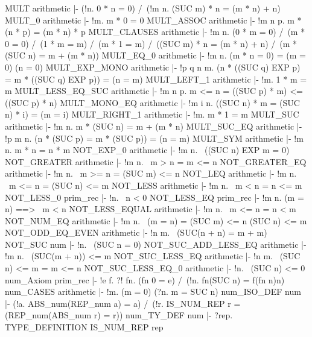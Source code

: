 \THEOREM MULT arithmetic
|- (!n. 0 * n = 0) /\ (!m n. (SUC m) * n = (m * n) + n)
\ENDTHEOREM
\THEOREM MULT\_0 arithmetic
|- !m. m * 0 = 0
\ENDTHEOREM
\THEOREM MULT\_ASSOC arithmetic
|- !m n p. m * (n * p) = (m * n) * p
\ENDTHEOREM
\THEOREM MULT\_CLAUSES arithmetic
|- !m n.
    (0 * m = 0) /\
    (m * 0 = 0) /\
    (1 * m = m) /\
    (m * 1 = m) /\
    ((SUC m) * n = (m * n) + n) /\
    (m * (SUC n) = m + (m * n))
\ENDTHEOREM
\THEOREM MULT\_EQ\_0 arithmetic
|- !m n. (m * n = 0) = (m = 0) \/ (n = 0)
\ENDTHEOREM
\THEOREM MULT\_EXP\_MONO arithmetic
|- !p q n m. (n * ((SUC q) EXP p) = m * ((SUC q) EXP p)) = (n = m)
\ENDTHEOREM
\THEOREM MULT\_LEFT\_1 arithmetic
|- !m. 1 * m = m
\ENDTHEOREM
\THEOREM MULT\_LESS\_EQ\_SUC arithmetic
|- !m n p. m <= n = ((SUC p) * m) <= ((SUC p) * n)
\ENDTHEOREM
\THEOREM MULT\_MONO\_EQ arithmetic
|- !m i n. ((SUC n) * m = (SUC n) * i) = (m = i)
\ENDTHEOREM
\THEOREM MULT\_RIGHT\_1 arithmetic
|- !m. m * 1 = m
\ENDTHEOREM
\THEOREM MULT\_SUC arithmetic
|- !m n. m * (SUC n) = m + (m * n)
\ENDTHEOREM
\THEOREM MULT\_SUC\_EQ arithmetic
|- !p m n. (n * (SUC p) = m * (SUC p)) = (n = m)
\ENDTHEOREM
\THEOREM MULT\_SYM arithmetic
|- !m n. m * n = n * m
\ENDTHEOREM
\THEOREM NOT\_EXP\_0 arithmetic
|- !m n. ~((SUC n) EXP m = 0)
\ENDTHEOREM
\THEOREM NOT\_GREATER arithmetic
|- !m n. ~m > n = m <= n
\ENDTHEOREM
\THEOREM NOT\_GREATER\_EQ arithmetic
|- !m n. ~m >= n = (SUC m) <= n
\ENDTHEOREM
\THEOREM NOT\_LEQ arithmetic
|- !m n. ~m <= n = (SUC n) <= m
\ENDTHEOREM
\THEOREM NOT\_LESS arithmetic
|- !m n. ~m < n = n <= m
\ENDTHEOREM
\THEOREM NOT\_LESS\_0 prim\_rec
|- !n. ~n < 0
\ENDTHEOREM
\THEOREM NOT\_LESS\_EQ prim\_rec
|- !m n. (m = n) ==> ~m < n
\ENDTHEOREM
\THEOREM NOT\_LESS\_EQUAL arithmetic
|- !m n. ~m <= n = n < m
\ENDTHEOREM
\THEOREM NOT\_NUM\_EQ arithmetic
|- !m n. ~(m = n) = (SUC m) <= n \/ (SUC n) <= m
\ENDTHEOREM
\THEOREM NOT\_ODD\_EQ\_EVEN arithmetic
|- !n m. ~(SUC(n + n) = m + m)
\ENDTHEOREM
\THEOREM NOT\_SUC num
|- !n. ~(SUC n = 0)
\ENDTHEOREM
\THEOREM NOT\_SUC\_ADD\_LESS\_EQ arithmetic
|- !m n. ~(SUC(m + n)) <= m
\ENDTHEOREM
\THEOREM NOT\_SUC\_LESS\_EQ arithmetic
|- !n m. ~(SUC n) <= m = m <= n
\ENDTHEOREM
\THEOREM NOT\_SUC\_LESS\_EQ\_0 arithmetic
|- !n. ~(SUC n) <= 0
\ENDTHEOREM
\THEOREM num\_Axiom prim\_rec
|- !e f. ?! fn. (fn 0 = e) /\ (!n. fn(SUC n) = f(fn n)n)
\ENDTHEOREM
\THEOREM num\_CASES arithmetic
|- !m. (m = 0) \/ (?n. m = SUC n)
\ENDTHEOREM
\THEOREM num\_ISO\_DEF num
|- (!a. ABS_num(REP_num a) = a) /\
   (!r. IS_NUM_REP r = (REP_num(ABS_num r) = r))
\ENDTHEOREM
\THEOREM num\_TY\_DEF num
|- ?rep. TYPE_DEFINITION IS_NUM_REP rep
